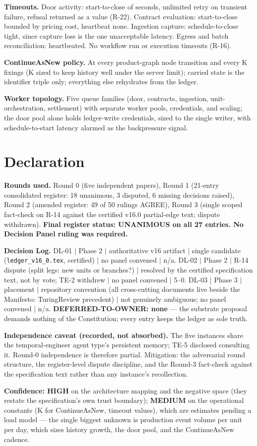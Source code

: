 \documentclass[11pt,a4paper]{article}
\begin{document}
\textbf{Timeouts.} Door activity: start-to-close of seconds, unlimited retry on
transient failure, refusal returned as a value (R-22). Contract evaluation:
start-to-close bounded by pricing cost, heartbeat none. Ingestion capture:
schedule-to-close tight, since capture loss is the one unacceptable latency. Egress and
batch reconciliation: heartbeated. No workflow run or execution timeouts (R-16).

\textbf{ContinueAsNew policy.} At every product-graph node transition and every K
fixings (K sized to keep history well under the server limit); carried state is the
identifier triple only; everything else rehydrates from the ledger.

\textbf{Worker topology.} Five queue families (door, contracts, ingestion,
unit-orchestration, settlement) with separate worker pools, credentials, and scaling;
the door pool alone holds ledger-write credentials, sized to the single writer, with
schedule-to-start latency alarmed as the backpressure signal.

\section{Declaration}

\textbf{Rounds used.} Round 0 (five independent papers), Round 1 (21-entry consolidated
register: 18 unanimous, 3 disputed, 6 missing decisions raised), Round 2 (amended
register: 49 of 50 rulings AGREE), Round 3 (single scoped fact-check on R-14 against the
certified v16.0 partial-edge text; dispute withdrawn). \textbf{Final register status:
UNANIMOUS on all 27 entries. No Decision Panel ruling was required.}

\textbf{Decision Log.} DL-01 $|$ Phase 2 $|$ authoritative v16 artifact $|$ single
candidate (\texttt{ledger\_v16\_0.tex}, certified) $|$ no panel convened $|$ n/a.
DL-02 $|$ Phase 2 $|$ R-14 dispute (split legs: new units or branches?) $|$ resolved by
the certified specification text, not by vote; TE-2 withdrew $|$ no panel convened $|$
5--0. DL-03 $|$ Phase 3 $|$ placement $|$ repository convention (all cross-cutting
documents live beside the Manifesto: TuringReview precedent) $|$ not genuinely
ambiguous; no panel convened $|$ n/a. \textbf{DEFERRED-TO-OWNER: none} --- the substrate
proposal demands nothing of the Constitution; every entry keeps the ledger as sole
truth.

\textbf{Independence caveat (recorded, not absorbed).} The five instances share the
temporal-engineer agent type's persistent memory; TE-5 disclosed consulting it. Round-0
independence is therefore partial. Mitigation: the adversarial round structure, the
register-level dispute discipline, and the Round-3 fact-check against the specification
text rather than any instance's recollection.

\textbf{Confidence: HIGH} on the architecture mapping and the negative space (they
restate the specification's own trust boundary); \textbf{MEDIUM} on the operational
constants (K for ContinueAsNew, timeout values), which are estimates pending a load
model --- the single biggest unknown is production event volume per unit per day, which
sizes history growth, the door pool, and the ContinueAsNew cadence.
\end{document}
